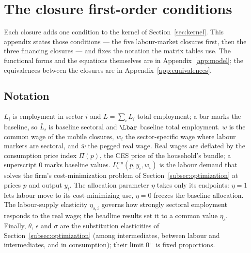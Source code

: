 \section{The closure first-order conditions}\label{app:closure-focs}

\noindent
Each closure adds one condition to the kernel of
Section~\ref{sec:kernel}. This appendix states those conditions --- the
five labour-market closures first, then the three financing closures --- and
fixes the notation the matrix tables use. The functional forms and the
equations themselves are in Appendix~\ref{app:model}; the equivalences
between the closures are in Appendix~\ref{app:equivalences}.

\subsection{Notation}\label{app:foc-notation}

$L_i$ is employment in sector $i$ and $L=\sum_i L_i$ total employment; a bar
marks the baseline, so $\bar L_i$ is baseline sectoral and $\Lbar$ baseline
total employment. $w$ is the common wage of the mobile closures, $w_i$ the
sector-specific wage where labour markets are sectoral, and $\bar w$ the
pegged real wage. Real wages are deflated by the consumption price index
$\Pi(p)$, the CES price of the household's bundle; a superscript $0$ marks
baseline values. $L_i^{\mathrm{cm}}(p,y_i,w_i)$ is the labour demand that
solves the firm's cost-minimization problem
of Section~\ref{subsec:optimization} at prices $p$ and output $y_i$. The
allocation parameter $\eta$ takes only its endpoints: $\eta=1$ lets labour
move to its cost-minimizing use, $\eta=0$ freezes the baseline allocation.
The labour-supply elasticity $\eta_{s,i}$ governs how strongly sectoral
employment responds to the real wage; the headline results set it to a
common value $\eta_s$. Finally, $\theta$, $\epsilon$ and $\sigma$ are the
substitution elasticities of Section~\ref{subsec:optimization} (among
intermediates, between labour and intermediates, and in consumption); their
limit $0^{+}$ is fixed proportions.


